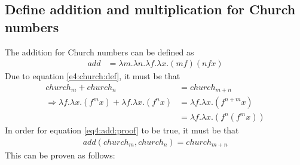 \subsection{Define addition and multiplication for Church numbers}
The addition for Church numbers can be defined as
\begin{align}
	add	&= \lambda m. \lambda n. \lambda f. \lambda x. (m f) (n f x) \label{eq4:add:proof}
\end{align}
Due to equation \ref{e4:church:def}, it must be that
\begin{align}
						church_m + church_n &= church_{m+n} \\
\Rightarrow \lambda f. \lambda x. (f^{m} x) + \lambda f. \lambda x. (f^{n} x)
																&= \lambda f. \lambda x. (f^{n+m} x) \\
																&= \lambda f. \lambda x. (f^{n}(f^{m} x))
\end{align}
In order for equation \ref{eq4:add:proof} to be true, it must be that
\begin{align}
		add(church_m, church_n) = church_{m+n}
\end{align}
This can be proven as follows:
